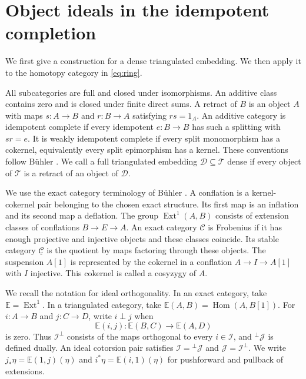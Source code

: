 \documentclass[11pt,a4paper,reqno]{amsart}
\newcommand{\Ccal}{\mathcal C}
\newcommand{\Dcal}{\mathcal D}
\newcommand{\Ical}{\mathcal I}
\newcommand{\Tcal}{\mathcal T}
\newcommand{\Hom}{\operatorname{Hom}}
\theoremstyle{plain}
\theoremstyle{definition}
\theoremstyle{remark}
\newcommand{\Jcal}{\mathcal J}
\newcommand{\Ext}{\operatorname{Ext}}
\begin{document}
\section{Object ideals in the idempotent completion}\label{sec:triangulated}

We first give a construction for a dense triangulated embedding. We then apply it to the homotopy category in \eqref{eq:ring}.

All subcategories are full and closed under isomorphisms. An additive class contains zero and is closed under finite direct sums. A retract of $B$ is an object $A$ with maps $s:A\to B$ and $r:B\to A$ satisfying $rs=1_A$. An additive category is idempotent complete if every idempotent $e:B\to B$ has such a splitting with $sr=e$. It is weakly idempotent complete if every split monomorphism has a cokernel, equivalently every split epimorphism has a kernel. These conventions follow B\"uhler \cite[Sections~6--7]{Buh10}. We call a full triangulated embedding $\Dcal\subseteq\Tcal$ dense if every object of $\Tcal$ is a retract of an object of $\Dcal$.

We use the exact category terminology of B\"uhler \cite[Sections~2 and~13.4]{Buh10}. A conflation is a kernel-cokernel pair belonging to the chosen exact structure. Its first map is an inflation and its second map a deflation. The group $\Ext^1(A,B)$ consists of extension classes of conflations $B\to E\to A$. An exact category $\Ccal$ is Frobenius if it has enough projective and injective objects and these classes coincide. Its stable category $\underline{\Ccal}$ is the quotient by maps factoring through these objects. The suspension $A[1]$ is represented by the cokernel in a conflation $A\to I\to A[1]$ with $I$ injective. This cokernel is called a cosyzygy of $A$.

We recall the notation for ideal orthogonality. In an exact category, take $\mathbb E=\Ext^1$. In a triangulated category, take $\mathbb E(A,B)=\Hom(A,B[1])$. For $i:A\to B$ and $j:C\to D$, write $i\perp j$ when
$$
\mathbb E(i,j):\mathbb E(B,C)\longrightarrow\mathbb E(A,D)
$$
is zero. Thus $\Ical^\perp$ consists of the maps orthogonal to every $i\in\Ical$, and ${}^\perp\Jcal$ is defined dually. An ideal cotorsion pair satisfies $\Ical={}^\perp\Jcal$ and $\Jcal=\Ical^\perp$. We write $j_*\eta=\mathbb E(1,j)(\eta)$ and $i^*\eta=\mathbb E(i,1)(\eta)$ for pushforward and pullback of extensions.
\end{document}

